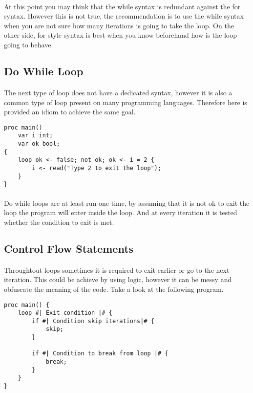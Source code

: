\paragraph{} At this point you may think that the while syntax is redundant
against the for syntax. However this is not true, the recommendation is to
use the while syntax when you are not sure how many iterations is going to take
the loop. On the other side, for style syntax is best when you know beforehand
how is the loop going to behave.

\subsection{Do While Loop}

\paragraph{} The next type of loop does not have a dedicated syntax, however
it is also a common type of loop present on many programming languages. 
Therefore here is provided an idiom to achieve the same goal.

\begin{verbatim}
proc main()
    var i int;
    var ok bool;
{
    loop ok <- false; not ok; ok <- i = 2 {
        i <- read("Type 2 to exit the loop");
    }
}
\end{verbatim}

\paragraph{} Do while loops are at least run one time, by assuming that it is
not ok to exit the loop the program will enter inside the loop. And at every
iteration it is tested whether the condition to exit is met.

\subsection{Control Flow Statements}\label{ctrl_flow}

\paragraph{} Throughtout loops sometimes it is required to exit earlier or
go to the next iteration. This could be achieve by using logic, however it can
be messy and obfuscate the meaning of the code. Take a look at the following
program.

\begin{verbatim}
proc main() {
    loop #| Exit condition |# {
        if #| Condition skip iterations|# {
            skip;
        }

        if #| Condition to break from loop |# {
            break;
        }
    }
}
\end{verbatim}

